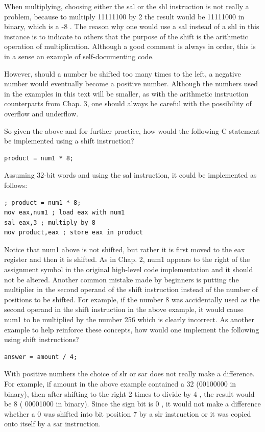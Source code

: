 \documentclass[10pt]{article}
\begin{document}
When multiplying, choosing either the sal or the shl instruction is not really a problem, because to multiply 11111100 by 2 the result would be 11111000 in binary, which is a -8 . The reason why one would use a sal instead of a shl in this instance is to indicate to others that the purpose of the shift is the arithmetic operation of multiplication. Although a good comment is always in order, this is in a sense an example of self-documenting code.

However, should a number be shifted too many times to the left, a negative number would eventually become a positive number. Although the numbers used in the examples in this text will be smaller, as with the arithmetic instruction counterparts from Chap. 3, one should always be careful with the possibility of overflow and underflow.

So given the above and for further practice, how would the following C statement be implemented using a shift instruction?

\begin{verbatim}
product = num1 * 8;
\end{verbatim}

Assuming 32-bit words and using the sal instruction, it could be implemented as follows:

\begin{verbatim}
; product = num1 * 8;
mov eax,num1 ; load eax with num1
sal eax,3 ; multiply by 8
mov product,eax ; store eax in product
\end{verbatim}

Notice that num1 above is not shifted, but rather it is first moved to the eax register and then it is shifted. As in Chap. 2, num1 appears to the right of the assignment symbol in the original high-level code implementation and it should not be altered. Another common mistake made by beginners is putting the multiplier in the second operand of the shift instruction instead of the number of positions to be shifted. For example, if the number 8 was accidentally used as the second operand in the shift instruction in the above example, it would cause num1 to be multiplied by the number 256 which is clearly incorrect. As another example to help reinforce these concepts, how would one implement the following using shift instructions?

\begin{verbatim}
answer = amount / 4;
\end{verbatim}

With positive numbers the choice of slr or sar does not really make a difference. For example, if amount in the above example contained a 32 (00100000 in binary), then after shifting to the right 2 times to divide by 4 , the result would be 8 ( 00001000 in binary). Since the sign bit is 0 , it would not make a difference whether a 0 was shifted into bit position 7 by a slr instruction or it was copied onto itself by a sar instruction.
\end{document}
